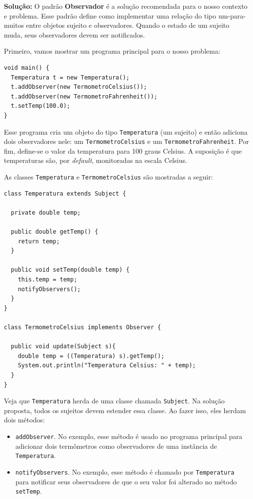 \documentclass[
  11pt,
  twoside]{book}
\newcommand{\passthrough}[1]{#1}
\begin{document}
\textbf{Solução:} O padrão \textbf{Observador} é a solução recomendada
para o nosso contexto e problema. Esse padrão define como implementar
uma relação do tipo um-para-muitos entre objetos sujeito e observadores.
Quando o estado de um sujeito muda, seus observadores devem ser
notificados.

Primeiro, vamos mostrar um programa principal para o nosso problema:

\begin{lstlisting}
void main() {
  Temperatura t = new Temperatura();
  t.addObserver(new TermometroCelsius());
  t.addObserver(new TermometroFahrenheit());
  t.setTemp(100.0);
}
\end{lstlisting}

Esse programa cria um objeto do tipo
\passthrough{\lstinline!Temperatura!} (um sujeito) e então adiciona dois
observadores nele: um \passthrough{\lstinline!TermometroCelsius!} e um
\passthrough{\lstinline!TermometroFahrenheit!}. Por fim, define-se o
valor da temperatura para 100 graus Celsius. A suposição é que
temperaturas são, por \emph{default}, monitoradas na escala Celsius.

As classes \passthrough{\lstinline!Temperatura!} e
\passthrough{\lstinline!TermometroCelsius!} são mostradas a seguir:

\begin{lstlisting}
class Temperatura extends Subject {

  private double temp;

  public double getTemp() {
    return temp;
  }

  public void setTemp(double temp) {
    this.temp = temp;
    notifyObservers();
  }
}

class TermometroCelsius implements Observer {

  public void update(Subject s){
    double temp = ((Temperatura) s).getTemp();
    System.out.println("Temperatura Celsius: " + temp);
  }
}
\end{lstlisting}

Veja que \passthrough{\lstinline!Temperatura!} herda de uma classe
chamada \passthrough{\lstinline!Subject!}. Na solução proposta, todos os
sujeitos devem estender essa classe. Ao fazer isso, eles herdam dois
métodos:

\begin{itemize}
\item
  \passthrough{\lstinline!addObserver!}. No exemplo, esse método é usado
  no programa principal para adicionar dois termômetros como
  observadores de uma instância de
  \passthrough{\lstinline!Temperatura!}.
\item
  \passthrough{\lstinline!notifyObservers!}. No exemplo, esse método é
  chamado por \passthrough{\lstinline!Temperatura!} para notificar seus
  observadores de que o seu valor foi alterado no método
  \passthrough{\lstinline!setTemp!}.
\end{itemize}
\end{document}
